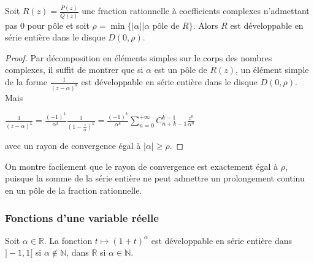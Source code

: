 \begin{thm}
Soit $R(z) = \frac{P(z)}{Q(z)}$ une fraction rationnelle à coefficients complexes n'admettant pas 0 pour pôle et soit $\rho = \min\{|\alpha| | \alpha \text{ pôle de } R\}$. Alors $R$ est développable en série entière dans le disque $D(0,\rho)$.
\end{thm}

\begin{proof}
Par décomposition en éléments simples sur le corps des nombres complexes, il suffit de montrer que si $\alpha$ est un pôle de $R(z)$, un élément simple de la forme $\frac{1}{(z-\alpha)^k}$ est développable en série entière dans le disque $D(0,\rho)$. Mais

$\frac{1}{(z-\alpha)^k} = \frac{(-1)^k}{\alpha^k} \frac{1}{(1-\frac{z}{\alpha})^k} = \frac{(-1)^k}{\alpha^k} \sum_{n=0}^{+\infty} C_{n+k-1}^{k-1} \frac{z^n}{\alpha^n}$

avec un rayon de convergence égal à $|\alpha| \geq \rho$.
\end{proof}

\begin{rem}
On montre facilement que le rayon de convergence est exactement égal à $\rho$, puisque la somme de la série entière ne peut admettre un prolongement continu en un pôle de la fraction rationnelle.
\end{rem}

\subsubsection{Fonctions d'une variable réelle}

\begin{lem}
Soit $\alpha \in \mathbb{R}$. La fonction $t \mapsto (1+t)^\alpha$ est développable en série entière dans $]-1,1[$ si $\alpha \notin \mathbb{N}$, dans $\mathbb{R}$ si $\alpha \in \mathbb{N}$.
\end{lem}

